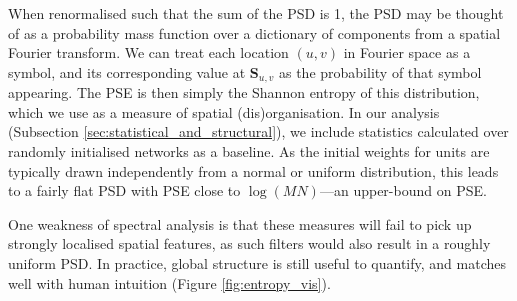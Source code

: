 When renormalised such that the sum of the PSD is 1, the PSD may be
thought of as a probability mass function over a dictionary of
components from a spatial Fourier transform. We can treat each location
\((u, v)\) in Fourier space as a symbol, and its corresponding value at
\(\mathbf{S}_{u, v}\) as the probability of that symbol appearing. The
PSE is then simply the Shannon entropy of this distribution, which we
use as a measure of spatial (dis)organisation. In our analysis
(Subsection \ref{sec:statistical_and_structural}), we include statistics
calculated over randomly initialised networks as a baseline. As the
initial weights for units are typically drawn independently from a
normal or uniform distribution, this leads to a fairly flat PSD with PSE
close to \(\log(MN)\)---an upper-bound on PSE.

One weakness of spectral analysis is that these measures will fail to
pick up strongly localised spatial features, as such filters would also
result in a roughly uniform PSD. In practice, global structure is still
useful to quantify, and matches well with human intuition (Figure
\ref{fig:entropy_vis}).

